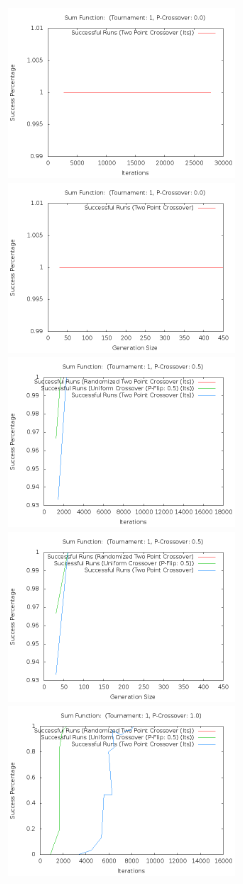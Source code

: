 \documentclass[10pt]{article}
\begin{document}
\begin{figure}[h!]
  \centering
    \includegraphics[height=170px]{img/SumFunctionRandomIters.png}
    \includegraphics[height=170px]{img/SumFunctionRandomGens.png}
    \includegraphics[height=170px]{img/SumFunctionBothIters.png}
    \includegraphics[height=170px]{img/SumFunctionBothGens.png}
    \includegraphics[height=170px]{img/SumFunctionCrossoverIters.png}

\end{figure}
\end{document}
